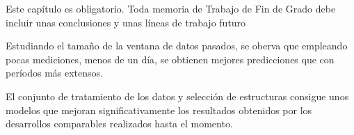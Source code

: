 Este capítulo es obligatorio. Toda memoria de Trabajo de Fin de Grado debe incluir unas conclusiones y unas líneas de trabajo futuro 

Estudiando el tamaño de la ventana de datos pasados, se oberva que empleando pocas mediciones, menos de un día, se obtienen mejores predicciones que con períodos más extensos.

El conjunto de tratamiento de los datos y selección de estructuras consigue unos modelos que mejoran significativamente los resultados obtenidos por los desarrollos comparables
realizados hasta el momento.